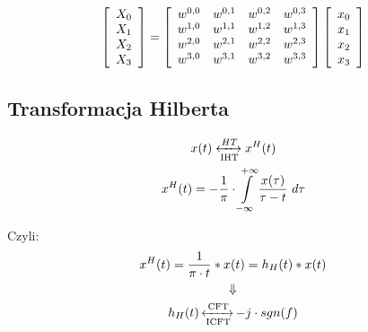         \begin{equation*}
            \left[
            \begin{array}{c}
                X_0\\
                X_1\\
                X_2\\
                X_3
            \end{array}
            \right]
            =\left[
            \begin{array}{c c c c}
                w^{0, 0} & w^{0, 1} & w^{0, 2} & w^{0, 3}\\
                w^{1, 0} & w^{1, 1} & w^{1, 2} & w^{1, 3}\\
                w^{2, 0} & w^{2, 1} & w^{2, 2} & w^{2, 3}\\
                w^{3, 0} & w^{3, 1} & w^{3, 2} & w^{3, 3} 
            \end{array}\right]
            \left[
            \begin{array}{c}
                x_0\\
                x_1\\
                x_2\\
                x_3
            \end{array}\right]
        \end{equation*}

         

    \subsection{Transformacja Hilberta}
        \begin{multicols}{2}
            \begin{gather*}
                x(t) \xleftrightarrow[\text{IHT}]{HT} x^H(t)\\
                x^H(t) = -\frac{1}{\pi}  \cdot \int\limits_{-\infty}^{+\infty}\frac{x(\tau)}{\tau-t}\ d\tau
            \end{gather*}

            \noindent Czyli:
            \begin{gather*}
                x^H(t) = \frac{1}{\pi\cdot t}*x(t) = h_H(t)*x(t)\\
                \Downarrow\\
                h_H(t) \operatorname{\xleftrightarrow[\text{ICFT}]{\text{CFT}}} -j \cdot sgn(f)
            \end{gather*}
        \end{multicols}

